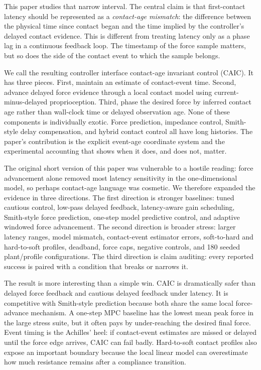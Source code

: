 \documentclass{article}
\newcommand{\caic}{CAIC}
\begin{document}
This paper studies that narrow interval. The central claim is that first-contact latency should be represented as a \emph{contact-age mismatch}: the difference between the physical time since contact began and the time implied by the controller's delayed contact evidence. This is different from treating latency only as a phase lag in a continuous feedback loop. The timestamp of the force sample matters, but so does the side of the contact event to which the sample belongs.

We call the resulting controller interface contact-age invariant control (\caic{}). It has three pieces. First, maintain an estimate of contact-event time. Second, advance delayed force evidence through a local contact model using current-minus-delayed proprioception. Third, phase the desired force by inferred contact age rather than wall-clock time or delayed observation age. None of these components is individually exotic. Force prediction, impedance control, Smith-style delay compensation, and hybrid contact control all have long histories. The paper's contribution is the explicit event-age coordinate system and the experimental accounting that shows when it does, and does not, matter.

The original short version of this paper was vulnerable to a hostile reading: force advancement alone removed most latency sensitivity in the one-dimensional model, so perhaps contact-age language was cosmetic. We therefore expanded the evidence in three directions. The first direction is stronger baselines: tuned cautious control, low-pass delayed feedback, latency-aware gain scheduling, Smith-style force prediction, one-step model predictive control, and adaptive windowed force advancement. The second direction is broader stress: larger latency ranges, model mismatch, contact-event estimator errors, soft-to-hard and hard-to-soft profiles, deadband, force caps, negative controls, and 180 seeded plant/profile configurations. The third direction is claim auditing: every reported success is paired with a condition that breaks or narrows it.

The result is more interesting than a simple win. \caic{} is dramatically safer than delayed force feedback and cautious delayed feedback under latency. It is competitive with Smith-style prediction because both share the same local force-advance mechanism. A one-step MPC baseline has the lowest mean peak force in the large stress suite, but it often pays by under-reaching the desired final force. Event timing is the Achilles' heel: if contact-event estimates are missed or delayed until the force edge arrives, \caic{} can fail badly. Hard-to-soft contact profiles also expose an important boundary because the local linear model can overestimate how much resistance remains after a compliance transition.
\end{document}
